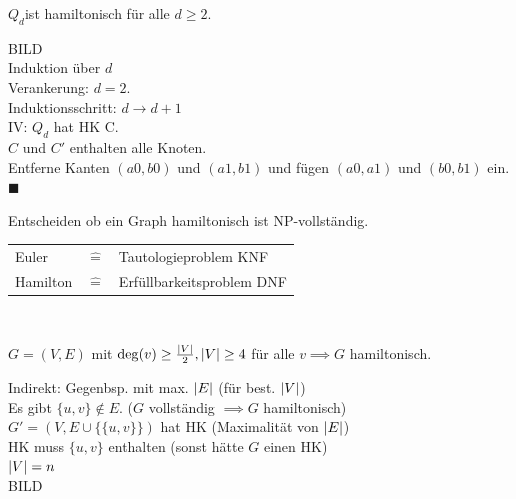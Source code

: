 $Q_d$ist hamiltonisch für alle $d \geq 2$.\\
\begin{bew}
	BILD \\
	Induktion über $d$ \\
	Verankerung: $d=2$. \\
	Induktionsschritt: $d \rightarrow d + 1$\\
	IV: $Q_d$ hat HK C. \\
	$C$ und $C'$ enthalten alle Knoten.\\
	Entferne Kanten $(a0,b0)$ und $(a1,b1)$ und fügen $(a0,a1)$ und $(b0,b1)$ ein. $\blacksquare$
\end{bew}
Entscheiden ob ein Graph hamiltonisch ist NP-vollständig. \\
\begin{tabular}{lcl}
	Euler		&$\hat{=}$	&Tautologieproblem KNF	\\
	Hamilton	&$\hat{=}$	&Erfüllbarkeitsproblem DNF	
\end{tabular}\\
\begin{satz*}
	$G=(V,E)$ mit $\deg(v) \geq \frac{\abs{V}}{2}, \abs{V} \geq 4$ für alle $v \implies G$ hamiltonisch. \\
	\begin{bew}
		Indirekt: Gegenbsp. mit max. $\abs{E}$ (für best. $\abs{V}$) \\
		Es gibt $\{ u,v \} \notin E$. ($G$ vollständig $\implies G$ hamiltonisch) \\
		$G' = (V,E \cup \{\{ u,v \}\})$ hat HK (Maximalität von $\abs{E}$) \\
		HK muss $\{ u,v \}$ enthalten (sonst hätte $G$ einen HK) \\
		$\abs{V} = n$ \\
		BILD \\
	\end{bew}
\end{satz*}
	
